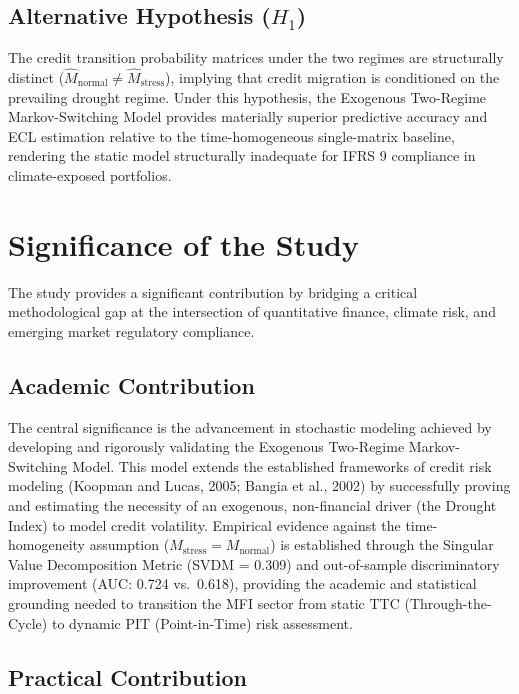 \documentclass[12pt,a4paper]{article}
\newcommand{\Mnormal}{M_{\text{normal}}}
\newcommand{\Mstress}{M_{\text{stress}}}
\begin{document}
\subsection{Alternative Hypothesis ($H_1$)}

The credit transition probability matrices under the two regimes are structurally distinct ($\hat{M}_{\text{normal}} \neq \hat{M}_{\text{stress}}$), implying that credit migration is conditioned on the prevailing drought regime. Under this hypothesis, the Exogenous Two-Regime Markov-Switching Model provides materially superior predictive accuracy and ECL estimation relative to the time-homogeneous single-matrix baseline, rendering the static model structurally inadequate for IFRS 9 compliance in climate-exposed portfolios.

\section{Significance of the Study}

The study provides a significant contribution by bridging a critical methodological gap at the intersection of quantitative finance, climate risk, and emerging market regulatory compliance.

\subsection{Academic Contribution}

The central significance is the advancement in stochastic modeling achieved by developing and rigorously validating the Exogenous Two-Regime Markov-Switching Model. This model extends the established frameworks of credit risk modeling (Koopman and Lucas, 2005; Bangia et al., 2002) by successfully proving and estimating the necessity of an exogenous, non-financial driver (the Drought Index) to model credit volatility. Empirical evidence against the time-homogeneity assumption ($\Mstress = \Mnormal$) is established through the Singular Value Decomposition Metric (SVDM = 0.309) and out-of-sample discriminatory improvement (AUC: 0.724 vs.\ 0.618), providing the academic and statistical grounding needed to transition the MFI sector from static TTC (Through-the-Cycle) to dynamic PIT (Point-in-Time) risk assessment.

\subsection{Practical Contribution}
\end{document}
